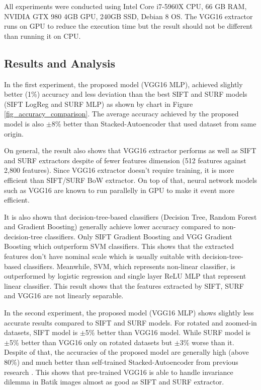 \documentclass[conference, compsoc]{IEEEtran}
\begin{document}
All experiments were conducted using Intel Core i7-5960X CPU, 66 GB RAM, NVIDIA GTX 980 4GB GPU, 240GB SSD, Debian 8 OS. The VGG16 extractor runs on GPU to reduce the execution time but the result should not be different than running it on CPU. 

\subsection{Results and Analysis}

In the first experiment, the proposed model (VGG16 MLP), achieved slightly better (1\%) accuracy and less deviation than the best SIFT and SURF models (SIFT LogReg and SURF MLP) as shown by chart in Figure \ref{fig_accuracy_comparison}. The average accuracy achieved by the proposed model is also $\pm$8\% better than Stacked-Autoencoder \cite{menzata2014sistem} that used dataset from same origin.

On general, the result also shows that VGG16 extractor performs as well as SIFT and SURF extractors despite of fewer features dimension (512 features against 2,800 features). Since VGG16 extractor doesn't require training, it is more efficient than SIFT/SURF BoW extractor. On top of that, neural network models such as VGG16 are known to run parallelly in GPU \cite{krizhevsky2012imagenet} to make it event more efficient. 

It is also shown that decision-tree-based classifiers (Decision Tree, Random Forest and Gradient Boosting) generally achieve lower accuracy compared to non-decision-tree classifiers. Only SIFT Gradient Boosting and VGG Gradient Boosting which outperform SVM classifiers. This shows that the extracted features don't have nominal scale which is usually suitable with decision-tree-based classifiers. Meanwhile, SVM, which represents non-linear classifier, is outperformed by logistic regression and single layer ReLU MLP that represent linear classifier. This result shows that the features extracted by SIFT, SURF and VGG16 are not linearly separable.

In the second experiment, the proposed model (VGG16 MLP) shows slightly less accurate results compared to SIFT and SURF models. For rotated and zoomed-in datasets, SIFT model is $\pm$5\% better than VGG16 model. While SURF model is $\pm$5\% better than VGG16 only on rotated datasets but $\pm$3\% worse than it. Despite of that, the accuracies of the proposed model are generally high (above 80\%) and much better than self-trained Stacked-Autoencoder from previous research \cite{menzata2014sistem}. This shows that pre-trained VGG16 is able to handle invariance dilemma in Batik images almost as good as SIFT and SURF extractor.
\end{document}
